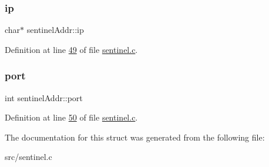 \subsubsection{\texorpdfstring{ip}{ip}}
{\footnotesize\ttfamily char$\ast$ sentinel\+Addr\+::ip}



Definition at line \hyperlink{sentinel_8c_source_l00049}{49} of file \hyperlink{sentinel_8c_source}{sentinel.\+c}.

\mbox{\label{structsentinelAddr_a8198758f2cd8b884aa6eda42bc8e40fb}} 
\subsubsection{\texorpdfstring{port}{port}}
{\footnotesize\ttfamily int sentinel\+Addr\+::port}



Definition at line \hyperlink{sentinel_8c_source_l00050}{50} of file \hyperlink{sentinel_8c_source}{sentinel.\+c}.



The documentation for this struct was generated from the following file\+:\begin{DoxyCompactItemize}
\item 
src/sentinel.\+c\end{DoxyCompactItemize}
